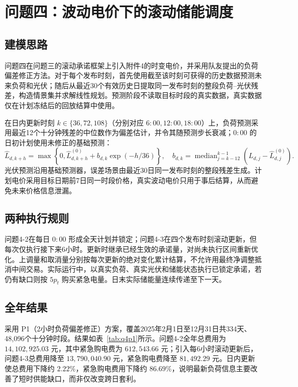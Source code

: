 \section{问题四：波动电价下的滚动储能调度}

\subsection{建模思路}
问题四在问题三的滚动承诺框架上引入附件4的时变电价，并采用队友提出的负荷偏差修正方法。对于每个发布时刻，首先使用截至该时刻可获得的历史数据预测未来负荷和光伏；随后从最近30个有效历史日提取同一发布时刻的整段负荷--光伏残差，构造情景集并求解线性规划。预测阶段不读取目标时段的真实数据，真实数据仅在计划冻结后的回放结算中使用。

在日内更新时刻 $k\in\{36,72,108\}$（分别对应 $6{:}00,12{:}00,18{:}00$）上，负荷预测采用最近12个十分钟残差的中位数作为偏差估计，并令其随预测步长衰减；$0{:}00$ 的日初计划使用未修正的基础预测：
\[
\widehat L_{d,k+h}=\max\left\{0,\widehat L^{(0)}_{d,k+h}+b_{d,k}\exp(-h/36)\right\},
\quad
b_{d,k}=\operatorname{median}_{j=k-12}^{k-1}(L_{d,j}-\widehat L^{(0)}_{d,j}).
\]
光伏预测沿用基础预测器，误差场景由最近30日同一发布时刻的整段残差生成。计划电价采用目标日期前7日同一时段价格，真实波动电价只用于事后结算，从而避免未来价格信息泄漏。

\subsection{两种执行规则}
问题4-2在每日 $0{:}00$ 形成全天计划并锁定；问题4-3在四个发布时刻滚动更新，但每次仅执行接下来6小时。更新时继承已经生效的承诺量，对尚未执行区间重新优化。上调量和取消量分别按每次更新的绝对变化累计结算，不允许用最终净调整抵消中间交易。实际运行中，以真实负荷、真实光伏和储能状态执行已锁定承诺，若仍有缺口则按 $5p_t$ 购买紧急电量。日末实际储能量连续传递至下一天。

\subsection{全年结果}
采用 P1（2小时负荷偏差修正）方案，覆盖2025年2月1日至12月31日共334天、48,096个十分钟时段。结果如表~\ref{tab:q4p1}所示。问题4-2全年总费用为 $14,102,925.03$ 元，其中紧急购电费为 $612,543.66$ 元；引入每6小时滚动更新后，问题4-3总费用降至 $13,790,040.90$ 元，紧急购电费降至 $81,492.29$ 元。日内更新使总费用下降约 $2.22\%$，紧急购电费用下降约 $86.69\%$，说明最新负荷信息主要改善了短时供能缺口，而非仅改变跨日套利。

